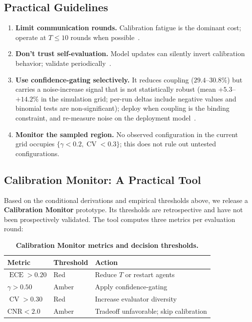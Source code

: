 \documentclass[11pt]{article}
\DeclareMathOperator{\CV}{CV}
\DeclareMathOperator{\ECE}{ECE}
\begin{document}
\subsection{Practical Guidelines}

\begin{enumerate}[leftmargin=*,nosep]
    \item \textbf{Limit communication rounds.} Calibration fatigue is the dominant cost; operate at $T \leq 10$ rounds when possible~\citep{li2025sacd}.
    \item \textbf{Don't trust self-evaluation.} Model updates can silently invert calibration behavior; validate periodically~\citep{zhou2024incontext}.
    \item \textbf{Use confidence-gating selectively.} It reduces coupling ($29.4$--$30.8\%$) but carries a noise-increase signal that is not statistically robust (mean $+5.3$--$+14.2\%$ in the simulation grid; per-run deltas include negative values and binomial tests are non-significant); deploy when coupling is the binding constraint, and re-measure noise on the deployment model~\citep{chen2025unicr}.
    \item \textbf{Monitor the sampled region.} No observed configuration in the current grid occupies $\{\gamma < 0.2, \CV < 0.3\}$; this does not rule out untested configurations.
\end{enumerate}

\subsection{Calibration Monitor: A Practical Tool}

Based on the conditional derivations and empirical thresholds above, we release a \textbf{Calibration Monitor} prototype. Its thresholds are retrospective and have not been prospectively validated. The tool computes three metrics per evaluation round:

\begin{table}[H]
\centering
\caption{\textbf{Calibration Monitor metrics and decision thresholds.}}
\begin{tabular}{@{}lll@{}}
\toprule
Metric & Threshold & Action \\
\midrule
$\ECE > 0.20$ & Red & Reduce $T$ or restart agents \\
$\gamma > 0.50$ & Amber & Apply confidence-gating \\
$\CV > 0.30$ & Red & Increase evaluator diversity \\
$\text{CNR} < 2.0$ & Amber & Tradeoff unfavorable; skip calibration \\
\bottomrule
\end{tabular}
\end{table}
\end{document}
